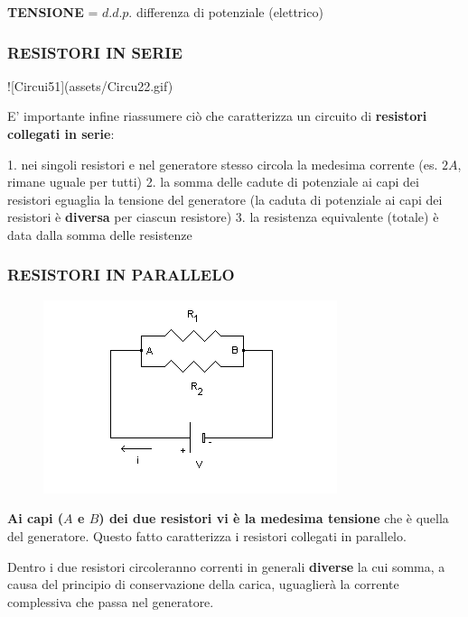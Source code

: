 \documentclass{article}
\begin{document}
\textbf{TENSIONE} = $d.d.p.$ differenza di potenziale (elettrico)

\subsubsection{RESISTORI IN SERIE}

![Circui51](assets/Circu22.gif)


E' importante infine riassumere ciò che caratterizza un circuito di \textbf{resistori collegati in serie}:    

  1. nei singoli resistori e nel generatore stesso circola la medesima corrente (es. $2A$, rimane uguale per tutti)
  2. la somma delle cadute di potenziale ai capi dei resistori eguaglia la tensione del generatore (la caduta di potenziale ai capi dei resistori è \textbf{diversa} per ciascun resistore)
  3. la resistenza equivalente (totale) è data dalla somma delle resistenze

\subsubsection{RESISTORI IN PARALLELO}

\begin{figure}
  \includegraphics[width=\linewidth]{parallelo.png}
\end{figure}

\textbf{Ai capi ($A$ e $B$) dei due resistori vi è la medesima tensione} che è quella del generatore. Questo fatto caratterizza i resistori collegati in parallelo.

Dentro i due resistori circoleranno correnti in generali \textbf{diverse} la cui somma, a causa del principio di conservazione della carica, uguaglierà la corrente complessiva che passa nel generatore.
\end{document}
